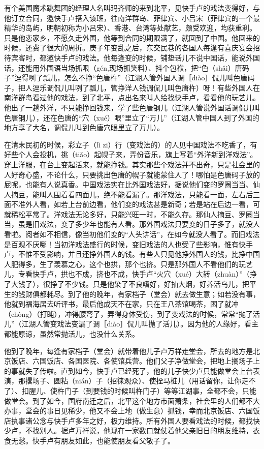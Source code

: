 \documentclass[12pt,UTF8]{ctexbook}
\begin{document}
有个美国魔术跳舞团的经理人名叫玛齐师的来到北平，见快手卢的戏法变得好，与他订立合同，邀快手卢搭入该班，往南洋群岛、菲律宾、小吕宋（菲律宾的一个最精华的岛屿，明朝初称为小吕宋）、香港、台湾等处献艺，颇受欢迎，均获重利。只是他恋家乡，不愿久走外国，他等到合同的期限满了，就回到了中国。他回来的时候，还费了很大的周折。庚子年变乱之后，东交民巷的各国人每逢有喜庆宴会招待宾客时，都邀快手卢的戏法。他每逢变的时候，铺垫话儿不说中国话，能说外国话，还能用外国语当场抓哏（gén,现场抓笑料）、抖个包袱，把“色（shǎi）唐码子”逗得咧了瓢儿，怎么不挣“色唐杵”（江湖人管外国人调［diào］侃儿叫色唐码子，把人逗乐调侃儿叫咧了瓢儿，管挣洋人钱调侃儿叫色唐杵）呀！有些外国人在南洋群岛看过他的戏法，到了北平，点出名来叫人给找快手卢，看看他的玩艺儿。他出了一趟外洋，不只能挣回钱来，学了些色唐钢儿（江湖人管说外国话调侃儿叫色唐钢儿），还在色唐的“穴（xué）眼”里立了“万儿”（江湖人管中国人到了外国的地方享了大名，调侃儿叫到色唐穴眼里立了万儿）。

在清末民初的时候，彩立子（lì zi）行（变戏法的）的人见中国戏法不吃香了，有好些个人会投机，挑（tiǎo）起幌子来，弄份音乐，旗上写着“外洋新到洋戏法”。穿上洋服，在台上变起活来，就能挣钱。其实那些个戏法并不出奇，只是社会里的人好奇心盛，不论什么，只要挑出色唐的幌子就能蒙住人了！哪怕是色唐码子放的屁呢，也能有人说真香。中国戏法实在比外国戏法好，据说他们变的罗圈当当、仙人摘豆，能叫人围着看四面儿，绝不能看漏了。那洋戏法，只能看一面，左右后三面不准外人看，如若上台前边看，他们变的戏法甚是新奇；若是站在后边一看，可就稀松平常了。洋戏法无论多好，只能兴旺一时，不能久存。那仙人摘豆、罗圈当当，虽是旧戏法，变了多少年也能有人看。那外国戏法只要变的日子多了，就没人看啦。阅者如不相信，像当初他们变的“人头讲话”，在如今就没人看了。而旧戏法是百观不厌哪！当初洋戏法盛行的时候，变旧戏法的人也受了些影响，惟有快手卢，不惟不受影响，并且还挣外国人的钱。有些人只见他挣外国人的钱，比挣中国人肥得多，生了羡慕之心，这个也拱，那个也挤。只是那外国人不看他们的玩艺儿，专看快手卢，拱也不成，挤也不成，快手卢“火穴（xué）大转（zhuàn）”（挣了大钱了），很挣了不少钱。只是他染了不良嗜好，好抽大烟，好养活鸟儿，把平生的钱财俱都耗尽。到了他的晚年，有家档子（堂会）就去做生意；如若没有事，他就到福海居去听评书，最后他成天不在家，只在王八茶馆喝茶，困了就冲（chòng）（打盹），冲得腰弯了，弄得身体受伤，到了变戏法的时候，常常“抛了活儿”（江湖人管变戏法变漏了调［diào］侃儿叫抛了活儿）。因为他的人缘好，看主都能原谅，虽然常抛活儿，也没什么关系。

他到了晚年，每逢有家档子（堂会）就带着他儿子卢万祥走堂会，所去的地方是北京饭店、六国饭店、各国医院、各使馆兵营。他们父子净做堂会，把地上搁场子上的事就失了传啦。直到如今，快手卢已经死了，他的儿子快少卢只能做堂会上台表演，那撂场子、圆粘（nián）子（招徕观众）、使拴马桩儿（用话留你，让你走不了）、扣腥儿、使杵门子（到要钱的时候叫杵门子）等等江湖事，全都不会，只能做堂会。到了如今，国府南迁之后，北平这个地方市面萧条，社会里的人们都不大办事，堂会的事日见稀少，他又不会上地（做生意）抓钱，幸而北京饭店、六国饭店执事诸公念与快手卢多年之好，极力维持。所有外国人要看戏法的时候，都找快少卢，不找别人。据卢万祥说，他现在一家数口就仗着他父亲旧日的朋友维持，衣食无愁。快手卢有朋友如此，也能使朋友看父敬子了。
\end{document}
